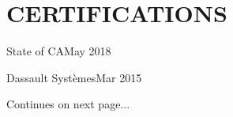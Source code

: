 \section*{CERTIFICATIONS}

\subtitle{Engineering-In-Training}{State of CA}{May 2018}
\subtitle{Solidworks CSWA}{Dassault Systèmes}{Mar 2015}

\bigskip\bigskip

Continues on next page...
\pagebreak

